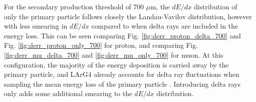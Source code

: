 For the secondary production threshold of 700 $\mu$m, the $dE/dx$ distribution of only the primary particle follows closely the Landau-Vavilov distribution, however with less smearing in $dE/dx$ compared to when delta rays are included in the energy loss.
This can be seen comparing Fig. \ref{fig:derr_proton_delta_700} and Fig. \ref{fig:derr_proton_only_700} for proton, and comparing Fig. \ref{fig:derr_mu_delta_700} and \ref{fig:derr_mu_only_700} for muon. 
At this configuration, the majority of the energy deposition is carried away by the primary particle, and LArG4 already accounts for delta ray fluctuations when sampling the mean energy loss of the primary particle \cite{geant4}.
Introducing delta rays only adds some additional smearing to the $dE/dx$ distribution.
